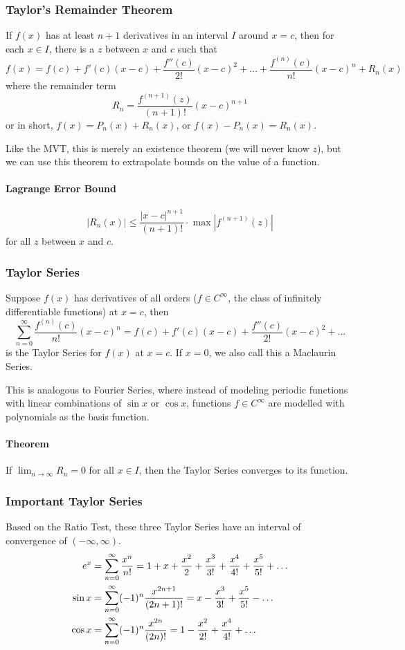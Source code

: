 \documentclass{article}
\begin{document}
\subsubsection{Taylor's Remainder Theorem}
If $f(x)$ has at least $n+1$ derivatives in an interval $I$ around $x=c$, then for each $x \in I$, there is a $z$ between $x$ and $c$ such that
$$f(x) = f(c) + f'(c)\left(x-c\right) + \frac{f''(c)}{2!}\left(x-c\right)^2 + \ldots + \frac{f^{(n)}(c)}{n!}\left(x-c\right)^n+R_n(x)$$
where the remainder term $$R_n=\frac{f^{(n+1)}(z)}{(n+1)!}\left(x-c\right)^{n+1}$$
or in short, $f(x) = P_n(x) + R_n(x)$, or $f(x) - P_n(x) = R_n(x)$.

Like the MVT, this is merely an existence theorem (we will never know $z$), but we can use this theorem to extrapolate bounds on the value of a function.

\paragraph{Lagrange Error Bound}
$$\left|R_n(x)\right|\le\frac{\left|x-c\right|^{n+1}}{(n+1)!}\cdot\max\left|f^{(n+1)}(z)\right|$$
for all $z$ between $x$ and $c$.

\subsubsection{Taylor Series}
Suppose $f(x)$ has derivatives of all orders ($f\in C^\infty$, the class of infinitely differentiable functions) at $x=c$, then
$$\sum_{n=0}^\infty \frac{f^{(n)}(c)}{n!}\left(x-c\right)^n=f(c)+f'(c)\left(x-c\right)+\frac{f''(c)}{2!}\left(x-c\right)^2+\ldots$$
is the Taylor Series for $f(x)$ at $x=c$. If $x=0$, we also call this a Maclaurin Series.

This is analogous to Fourier Series, where instead of modeling periodic functions with linear combinations of $\sin{x}$ or $\cos{x}$, functions $f\in C^\infty$ are modelled with polynomials as the basis function.

\paragraph{Theorem} If $\lim_{n\to\infty}\limits R_n=0$ for all $x\in I$, then the Taylor Series converges to its function.

\subsubsection{Important Taylor Series}
Based on the Ratio Test, these three Taylor Series have an interval of convergence of $\left(-\infty,\infty\right)$.
\begin{align*}
    e^x&=\sum_{n=0}^{\infty}\limits\frac{x^n}{n!}=1+x+\frac{x^2}{2}+\frac{x^3}{3!}+\frac{x^4}{4!}+\frac{x^5}{5!}+\ldots\\
    \sin{x}&=\sum_{n=0}^\infty(-1)^n\frac{x^{2n+1}}{(2n+1)!}=x-\frac{x^3}{3!}+\frac{x^5}{5!}-\ldots\\
    \cos{x}&=\sum_{n=0}^\infty(-1)^n\frac{x^{2n}}{(2n)!}=1-\frac{x^2}{2!}+\frac{x^4}{4!}+\ldots
\end{align*}
\end{document}
